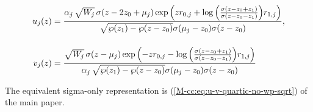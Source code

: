 \documentclass[11pt,a4paper]{article}
\newcommand{\externaleqref}[1]{\textup{(\ref*{#1})}}
\begin{document}
\begin{align}
u_j{\left(z\right)} &= \frac{\alpha_j\,\sqrt{W_j} \,\sigma{\left(z - 2 z_{0} + {\mu}_{j} \right)} \exp\left(z {r}_{0,j} + \log{\left(\frac{\sigma{\left(z - z_{0} + z_{1} \right)}}{\sigma{\left(z - z_{0} - z_{1} \right)}} \right)} {r}_{1,j}\right)}{\sqrt{\wp{\left(z_{1} \right)} - \wp{\left(z - z_{0} \right)}} \sigma{\left({\mu}_{j} - z_{0}\right)} \sigma{\left(z - z_{0} \right)}}, \notag \\[12pt]
v_j{\left(z\right)} &= \frac{\sqrt{W_j} \,\sigma{\left(z - {\mu}_{j} \right)} \exp\left(- z {r}_{0,j} - \log{\left(\frac{\sigma{\left(z - z_{0} + z_{1} \right)}}{\sigma{\left(z - z_{0} - z_{1} \right)}} \right)} {r}_{1,j} \right)}{\alpha_j\,\sqrt{\wp{\left(z_{1} \right)} - \wp{\left(z - z_{0} \right)}} \sigma{\left({\mu}_{j} - z_{0}\right)} \sigma{\left(z - z_{0}\right)}} \label{cc:eq:u-v-quartic}
\end{align}

The equivalent sigma-only representation is \externaleqref{M-cc:eq:u-v-quartic-no-wp-sqrt} of the main paper.
\end{document}
